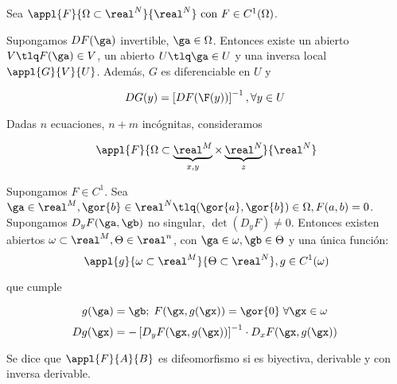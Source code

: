 \documentclass{apuntes}
\begin{document}
\begin{theorem}  \label{thmInv} Sea $\appl{F}{\Omega\subset\real^N}{\real^N} \text{ con } F\in C^1(\Omega)$.

Supongamos $DF(\ga)$ invertible, $\ga \in \Omega$. Entonces existe un abierto $V \tlq F(\ga)\in V$, un abierto $U \tlq \ga \in U$ y una inversa local $\appl{G}{V}{U}$. Además, $G$ es diferenciable en $U$ y

\[ DG(y) = \left[DF(\F(y))\right]^{-1}, \forall y \in U \]
\end{theorem}

\begin{theorem} \label{thmFImp} Dadas $n$ ecuaciones, $n+m$ incógnitas, consideramos

$$\appl{F}{\Omega\subset\underbrace{\real^M}_{x,y} \times \underbrace{\real^N}_{z}}{\real^N}$$

Supongamos $F\in C^1$. Sea $\ga \in \real^M, \gor{b} \in \real^N \tlq (\gor{a},\gor{b})\in \Omega , F(a,b)=0$. Supongamos $D_yF(\ga,\gb)$ no singular, $\det(D_yF)\neq 0$. Entonces existen abiertos $\omega \subset \real^M, \Theta \in\real^n$, con $\ga \in \omega, \gb \in \Theta$ y una única función: \[ \appl{g}{\omega\subset\real^M}{\Theta \subset\real^N}, g\in C^1(\omega) \]

que cumple

\[ g(\ga) = \gb;\; F(\gx,g(\gx)) = \gor{0}\; \forall \gx \in \omega \]
\[ Dg(\gx) = - \left[D_yF(\gx,g(\gx))\right]^{-1} \cdot D_xF(\gx,g(\gx)) \]
\end{theorem}

\begin{defn}[Difeomorfismo] Se dice que $\appl{F}{A}{B}$ es difeomorfismo si es biyectiva, derivable y con inversa derivable. \label{defDifeomorfismo}
\end{defn}

\printindex
\end{document}
